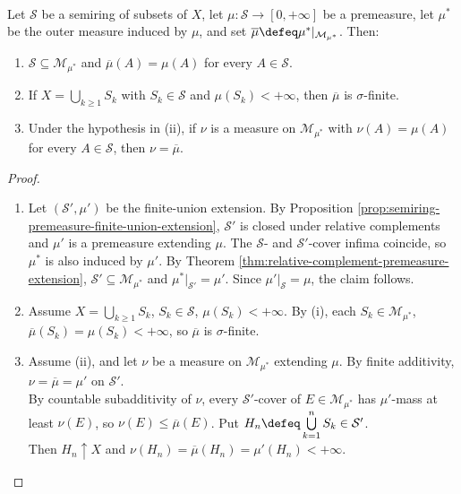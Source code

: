 \begin{theorem} \label{thm:caratheodory-hahn-semiring-extension} \\
Let $\mathcal{S}$ be a semiring of subsets of $X$, let $\mu:\mathcal{S}\to[0,+\infty]$ be a premeasure, let $\mu^\ast$ be the outer measure induced by $\mu$, and set $\overline{\mu}\defeq\mu^\ast|_{\mathcal{M}_{\mu^\ast}}$. Then:
\begin{enumerate}[label=(\roman*)]
\setlength{\itemsep}{0pt}
\item $\mathcal{S}\subseteq\mathcal{M}_{\mu^\ast}$ and $\overline{\mu}(A)=\mu(A)$ for every $A\in\mathcal{S}$.
\item If $X=\bigcup\limits_{k\geq1}S_k$ with $S_k\in\mathcal{S}$ and $\mu(S_k)<+\infty$, then $\overline{\mu}$ is $\sigma$-finite.
\item Under the hypothesis in (ii), if $\nu$ is a measure on $\mathcal{M}_{\mu^\ast}$ with $\nu(A)=\mu(A)$ for every $A\in\mathcal{S}$, then $\nu=\overline{\mu}$.
\end{enumerate}
\begin{proof}
\begin{enumerate}[label=(\roman*)]
\setlength{\itemsep}{0pt}
\item Let $(\mathcal{S}',\mu')$ be the finite-union extension. By Proposition \ref{prop:semiring-premeasure-finite-union-extension}, $\mathcal{S}'$ is closed under relative complements and $\mu'$ is a premeasure extending $\mu$. The $\mathcal{S}$- and $\mathcal{S}'$-cover infima coincide, so $\mu^\ast$ is also induced by $\mu'$. By Theorem \ref{thm:relative-complement-premeasure-extension}, $\mathcal{S}'\subseteq\mathcal{M}_{\mu^\ast}$ and $\mu^\ast|_{\mathcal{S}'}=\mu'$. Since $\mu'|_{\mathcal{S}}=\mu$, the claim follows.
\item Assume $X=\bigcup\limits_{k\geq1}S_k$, $S_k\in\mathcal{S}$, $\mu(S_k)<+\infty$. By (i), each $S_k\in\mathcal{M}_{\mu^\ast}$, $\overline{\mu}(S_k)=\mu(S_k)<+\infty$, so $\overline{\mu}$ is $\sigma$-finite.
\item Assume (ii), and let $\nu$ be a measure on $\mathcal{M}_{\mu^\ast}$ extending $\mu$. By finite additivity, $\nu=\overline{\mu}=\mu'$ on $\mathcal{S}'$.\\
By countable subadditivity of $\nu$, every $\mathcal{S}'$-cover of $E\in\mathcal{M}_{\mu^\ast}$ has $\mu'$-mass at least $\nu(E)$, so $\nu(E)\leq\overline{\mu}(E)$. Put $H_n\defeq\bigcup\limits_{k=1}^{n}S_k\in\mathcal{S}'$.\\
Then $H_n\uparrow X$ and $\nu(H_n)=\overline{\mu}(H_n)=\mu'(H_n)<+\infty$.\\

\end{enumerate}
\end{proof}
\end{theorem}
